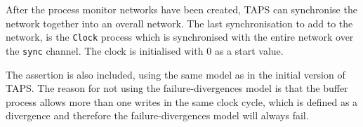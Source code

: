After the process monitor networks have been created, TAPS can synchronise the network together into an overall network.
The last synchronisation to add to the network, is the \texttt{Clock} process which is synchronised with the entire network over the \texttt{sync} channel. The clock is initialised with 0 as a start value.

The assertion is also included, using the same model as in the initial version of TAPS. The reason for not using the failure-divergences model is that the buffer process allows more than one writes in the same clock cycle, which is defined as a divergence and therefore the failure-divergences model will always fail.


%



